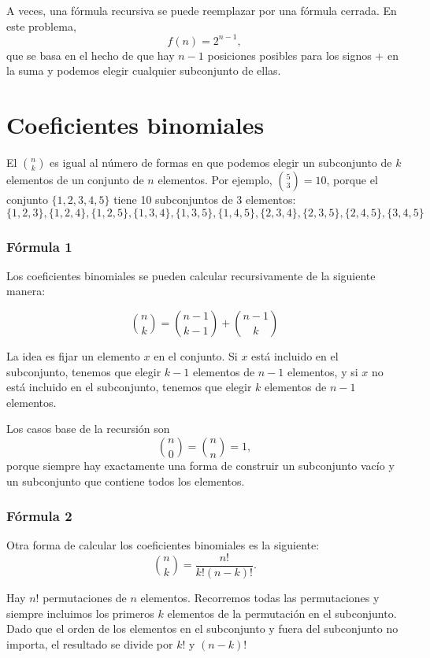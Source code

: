 A veces, una fórmula recursiva se puede reemplazar
por una fórmula cerrada.
En este problema,
\[
f(n)=2^{n-1},
\]
que se basa en el hecho de que hay $n-1$
posiciones posibles para los signos + en la suma
y podemos elegir cualquier subconjunto de ellas.

\section{Coeficientes binomiales}


El  ${n \choose k}$
es igual al número de formas en que podemos elegir un subconjunto
de $k$ elementos de un conjunto de $n$ elementos.
Por ejemplo, ${5 \choose 3}=10$,
porque el conjunto $\{1,2,3,4,5\}$
tiene 10 subconjuntos de 3 elementos:
\[ \{1,2,3\}, \{1,2,4\}, \{1,2,5\}, \{1,3,4\}, \{1,3,5\},
\{1,4,5\}, \{2,3,4\}, \{2,3,5\}, \{2,4,5\}, \{3,4,5\} \]

\subsubsection{Fórmula 1}

Los coeficientes binomiales se pueden
calcular recursivamente de la siguiente manera:

\[
{n \choose k}  =  {n-1 \choose k-1} + {n-1 \choose k}
\]

La idea es fijar un elemento $x$ en el conjunto.
Si $x$ está incluido en el subconjunto,
tenemos que elegir $k-1$
elementos de $n-1$ elementos,
y si $x$ no está incluido en el subconjunto,
tenemos que elegir $k$ elementos de $n-1$ elementos.

Los casos base de la recursión son
\[
{n \choose 0}  =  {n \choose n} = 1,
\]
porque siempre hay exactamente
una forma de construir un subconjunto vacío
y un subconjunto que contiene todos los elementos.

\subsubsection{Fórmula 2}

Otra forma de calcular los coeficientes binomiales es la siguiente:
\[
{n \choose k}  =  \frac{n!}{k!(n-k)!}.
\]

Hay $n!$ permutaciones de $n$ elementos.
Recorremos todas las permutaciones y siempre
incluimos los primeros $k$ elementos de la permutación
en el subconjunto.
Dado que el orden de los elementos en el subconjunto
y fuera del subconjunto no importa,
el resultado se divide por $k!$ y $(n-k)!$

